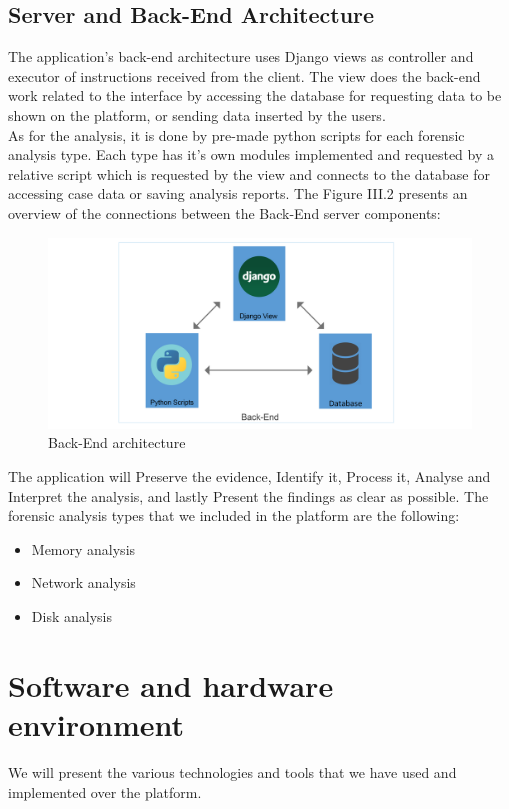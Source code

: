 \subsection{Server and Back-End Architecture}
The application's back-end architecture uses Django views as controller and executor of instructions received from the client. The view does the back-end work related to the interface by accessing the database for requesting data to be shown on the platform, or sending data inserted by the users.\\As for the analysis, it is done by pre-made python scripts for each forensic analysis type. Each type has it's own modules implemented and requested by a relative script which is requested by the view and connects to the database for accessing case data or saving analysis reports. The Figure III.2 presents an overview of the connections between the Back-End server components:
\begin{figure}[H]
\centering
\includegraphics[width=1\columnwidth]{Figures/backarchitecture.png}
\caption{Back-End architecture}
\end{figure}
The application will Preserve the evidence, Identify it, Process it, Analyse and Interpret the analysis, and lastly Present the findings as clear as possible. The forensic analysis types that we included in the platform are the following:
\begin{itemize}
    \item Memory analysis
    \item Network analysis
    \item Disk analysis
\end{itemize}


\section{Software and hardware environment}
We will present the various technologies and tools that we have used and implemented over the platform.
